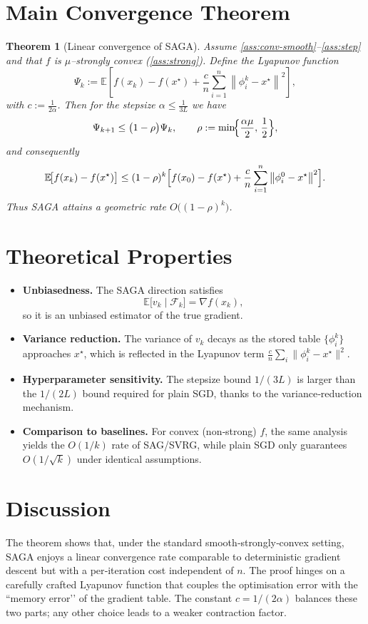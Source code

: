 \documentclass{article}
\newtheorem{theorem}{Theorem}
\newcommand{\E}{\mathbb{E}}
\newcommand{\norm}[1]{\left\|#1\right\|}
\begin{document}
\section*{Main Convergence Theorem}
\begin{theorem}[Linear convergence of SAGA]\label{thm:linear}
Assume \ref{ass:conv-smooth}–\ref{ass:step} and that $f$ is $\mu$–strongly convex (\ref{ass:strong}).  
Define the Lyapunov function
\[
\Psi_k:=\E\!\left[f(x_k)-f(x^\star)+\frac{c}{n}\sum_{i=1}^{n}\norm{\phi_i^{k}-x^\star}^{2}\right],
\]
with $c:=\frac{1}{2\alpha}$.  
Then for the stepsize $\alpha\le\frac{1}{3L}$ we have
\[
\Psi_{k+1}\le\bigl(1-\rho\bigr)\Psi_k,\qquad 
\rho:=\min\!\Bigl\{\frac{\alpha\mu}{2},\,\frac{1}{2}\Bigr\},
\]
and consequently
\[
\E\!\bigl[f(x_k)-f(x^\star)\bigr]\le (1-\rho)^k\Bigl[f(x_0)-f(x^\star)+\frac{c}{n}\sum_{i=1}^{n}\norm{\phi_i^{0}-x^\star}^{2}\Bigr].
\]
Thus SAGA attains a geometric rate $O\!\bigl((1-\rho)^k\bigr)$.
\end{theorem}

\section*{Theoretical Properties}
\begin{itemize}[leftmargin=*]
\item \textbf{Unbiasedness.} The SAGA direction satisfies 
\[
\E\!\bigl[v_k\mid\mathcal{F}_k\bigr]=\nabla f(x_k),
\]
so it is an unbiased estimator of the true gradient.
\item \textbf{Variance reduction.} The variance of $v_k$ decays as the stored table $\{\phi_i^k\}$ approaches $x^\star$, which is reflected in the Lyapunov term $\frac{c}{n}\sum_i\|\phi_i^k-x^\star\|^2$.
\item \textbf{Hyperparameter sensitivity.} The stepsize bound $1/(3L)$ is larger than the $1/(2L)$ bound required for plain SGD, thanks to the variance‐reduction mechanism.
\item \textbf{Comparison to baselines.} For convex (non‑strong) $f$, the same analysis yields the $O(1/k)$ rate of SAG/SVRG, while plain SGD only guarantees $O(1/\sqrt{k})$ under identical assumptions.
\end{itemize}

\section*{Discussion}
The theorem shows that, under the standard smooth‑strongly‑convex setting, SAGA enjoys a linear convergence rate comparable to deterministic gradient descent but with a per‑iteration cost independent of $n$. The proof hinges on a carefully crafted Lyapunov function that couples the optimisation error with the “memory error’’ of the gradient table. The constant $c=1/(2\alpha)$ balances these two parts; any other choice leads to a weaker contraction factor.
\end{document}
